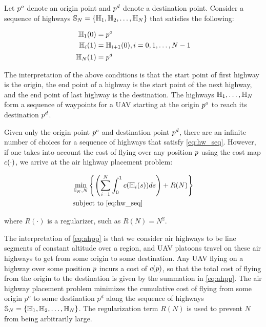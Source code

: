 Let $p^o$ denote an origin point and $p^d$ denote a destination point. Consider a sequence of highways $\mathbb{S}_N = \{\mathbb{H}_1, \mathbb{H}_2, \ldots, \mathbb{H}_N\}$ that satisfies the following:

\begin{equation}
\label{eq:hw_seq}
\begin{aligned}
\mathbb{H}_1(0) &= p^o \\
\mathbb{H}_i(1) &= \mathbb{H}_{i+1}(0), i = 0, 1, \ldots, N-1 \\
\mathbb{H}_N(1) &= p^d \\
\end{aligned}
\end{equation}

The interpretation of the above conditions is that the start point of first highway is the origin, the end point of a highway is the start point of the next highway, and the end point of last highway is the destination. The highways $\mathbb{H}_1,\ldots,\mathbb{H}_N$ form a sequence of waypoints for a UAV starting at the origin $p^o$ to reach its destination $p^d$.

Given only the origin point $p^o$ and destination point $p^d$, there are an infinite number of choices for a sequence of highways that satisfy \eqref{eq:hw_seq}. However, if one takes into account the cost of flying over any position $p$ using the cost map $c(\cdot)$, we arrive at the air highway placement problem:

\begin{equation}
\label{eq:ahpp} %
\begin{aligned}
& \min_{\hws_N, N} \left\{\left(\sum_{i=1}^N \int_0^1 \cmap(\hw_i(s)) ds\right) + R(N)\right\}\\
& \text{subject to \eqref{eq:hw_seq}} 
\end{aligned}
\end{equation}

\noindent where $R(\cdot)$ is a regularizer, such as $R(N) = N^2$.

The interpretation of \eqref{eq:ahpp} is that we consider air highways to be line segments of constant altitude over a region, and UAV platoons travel on these air highways to get from some origin to some destination. Any UAV flying on a highway over some position $p$ incurs a cost of $c(p)$, so that the total cost of flying from the origin to the destination is given by the summation in \eqref{eq:ahpp}. The air highway placement problem minimizes the cumulative cost of flying from some origin $p^o$ to some destination $p^d$ along the sequence of highways $\mathbb{S}_N=\{\mathbb{H}_1, \mathbb{H}_2, \ldots, \mathbb{H}_N\}$. The regularization term $R(N)$ is used to prevent $N$ from being arbitrarily large.

